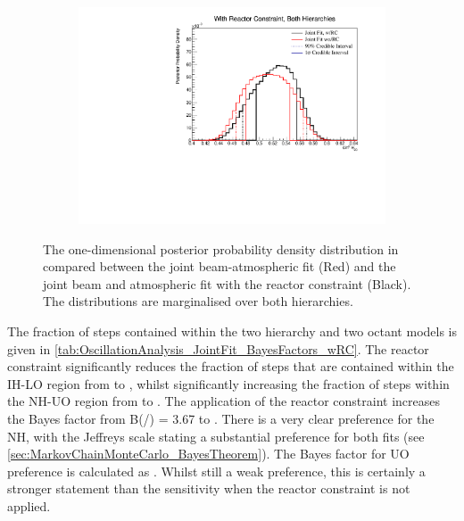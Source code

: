 \begin{figure}[h]
  \begin{subfigure}[t]{0.98\textwidth}
    \includegraphics[width=\textwidth, trim={0mm 0mm 0mm 0mm}, clip,page=1]{Figures/OA/JointFit_wRC_Comp/ContourComparison_1D_th23_BH_2_wRC_woRC_UnSmeared_CredibleInterval.pdf}
  \end{subfigure}
  \caption{The one-dimensional posterior probability density distribution in  compared between the joint beam-atmospheric fit (Red) and the joint beam and atmospheric fit with the reactor constraint (Black). The distributions are marginalised over both hierarchies.}
  \label{fig:OscillationAnalysis_JointFit_wRC_Comp_TH23}
\end{figure}

The fraction of steps contained within the two hierarchy and two octant models is given in \autoref{tab:OscillationAnalysis_JointFit_BayesFactors_wRC}. The reactor constraint significantly reduces the fraction of steps that are contained within the IH-LO region from  to , whilst significantly increasing the fraction of steps within the NH-UO region from  to . The application of the reactor constraint increases the Bayes factor from {B(/) = 3.67} to . There is a very clear preference for the NH, with the Jeffreys scale stating a substantial preference for both fits (see \autoref{sec:MarkovChainMonteCarlo_BayesTheorem}). The Bayes factor for UO preference is calculated as  . Whilst still a weak preference, this is certainly a stronger statement than the sensitivity when the reactor constraint is not applied.

